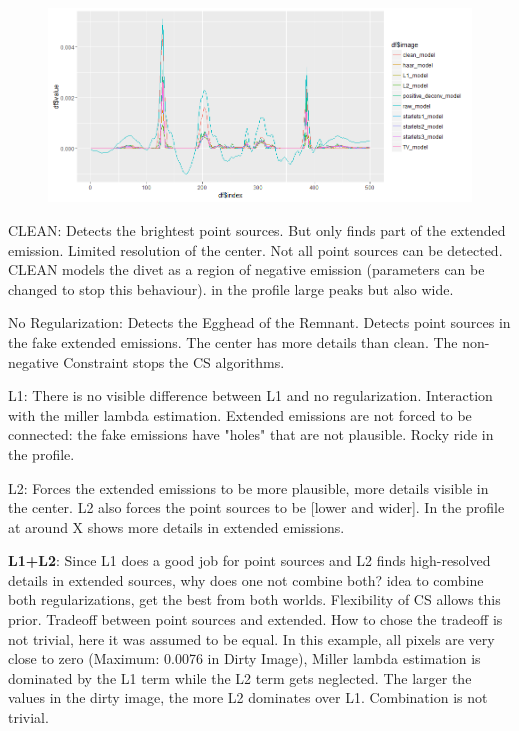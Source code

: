 \begin{figure}
	\includegraphics[width=\linewidth, trim={18px 19px 18px 18px}, clip]{./chapters/05.results/comparison_temp.png}
\end{figure}

CLEAN: Detects the brightest point sources. But only finds part of the extended emission. Limited resolution of the center. Not all point sources can be detected. CLEAN models the divet as a region of negative emission (parameters can be changed to stop this behaviour). in the profile large peaks but also wide.  

No Regularization: Detects the Egghead of the Remnant. Detects point sources in the fake extended emissions. The center has more details than clean. 
The non-negative Constraint stops the CS algorithms. 

L1: There is no visible difference between L1 and no regularization. Interaction with the miller lambda estimation. Extended emissions are not forced to be connected: the fake emissions have "holes" that are not plausible. Rocky ride in the profile.

L2: Forces the extended emissions to be more plausible, more details visible in the center. L2 also forces the point sources to be [lower and wider]. In the profile at around X shows more details in extended emissions.

\textbf{L1+L2}: Since L1 does a good job for point sources and L2 finds high-resolved details in extended sources, why does one not combine both? 
idea to combine both regularizations, get the best from both worlds. Flexibility of CS allows this prior. Tradeoff between point sources and extended. How to chose the tradeoff is not trivial, here it was assumed to be  equal. In this example, all pixels are very close to zero (Maximum: 0.0076 in Dirty Image), Miller lambda estimation is dominated by the L1 term while the L2 term gets neglected. The larger the values in the dirty image, the more L2 dominates over L1. Combination is not trivial.

